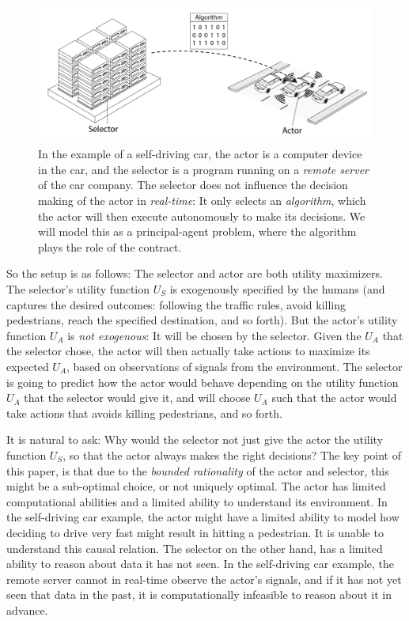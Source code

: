 \begin{figure}[H]
	\centering
	\captionsetup{labelfont=bf,font=small,labelsep=period}
	\includegraphics[width=0.8\linewidth]{"images/conceptual-diagrams/selector-actor-car"}
	\caption{\rightskip=20pt\leftskip=20pt In the example of a self-driving car, the actor is a computer device in the car, and the selector is a program running on a \textit{remote server} of the car company. The selector does not influence the decision making of the actor in \textit{real-time}: It only selects an \textit{algorithm}, which the actor will then execute autonomously to make its decisions. We will model this as a principal-agent problem, where the algorithm plays the role of the contract.
	}
	\label{fig:selector-actor-car} 	
\end{figure}


\medskip \noindent So the setup is as follows: The selector and actor are both utility maximizers. The selector's utility function $U_S$ is exogenously specified by the humans (and captures the desired outcomes: following the traffic rules, avoid killing pedestrians, reach the specified destination, and so forth). But the actor's utility function $U_A$ is \textit{not exogenous}: It will be chosen by the selector. Given the $U_A$ that the selector chose, the actor will then actually take actions to maximize its expected $U_A$, based on observations of signals from the environment. The selector is going to predict how the actor would behave depending on the utility function $U_A$ that the selector would give it, and will choose $U_A$ such that the actor would take actions that avoids killing pedestrians, and so forth.

It is natural to ask: Why would the selector not just give the actor the utility function $U_S$, so that the actor always makes the right decisions? The key point of this paper, is that due to the \textit{bounded rationality} of the actor and selector, this might be a sub-optimal choice, or not uniquely optimal. The actor has limited computational abilities and a limited ability to understand its environment. In the self-driving car example, the actor might have a limited ability to model how deciding to drive very fast might result in hitting a pedestrian. It is unable to understand this causal relation. The selector on the other hand, has a limited ability to reason about data it has not seen. In the self-driving car example, the remote server cannot in real-time observe the actor's signals, and if it has not yet seen that data in the past, it is computationally infeasible to reason about it in advance.

